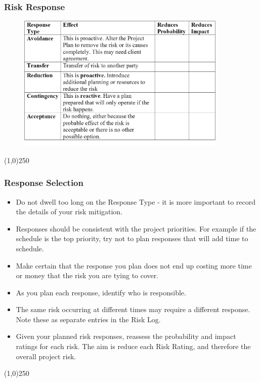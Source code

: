\begin{frame}
\frametitle{Risk Response}
\begin{figure}
	\centering
		\includegraphics[width = 10cm ]{images/Matrix.png}
	\label{fig:Matrix}
\end{figure}

\end{frame}\begin{center}\line(1,0){250}\end{center}





\begin{frame}
\frametitle{Response Selection}
\begin{itemize}
\item Do not dwell too long on the Response Type - it is more important to record the details of your risk mitigation.
\item Responses should be consistent with the project priorities. For example if the schedule is the top priority, try not to plan responses that will add time to schedule.
\item Make certain that the response you plan does not end up costing more time or money that the risk you are tying to cover. 
\item As you plan each response, identify who is responsible.
\item The same risk occurring at different times may require a different response. Note these as separate entries in the Risk Log.
\item Given your planned risk responses, reassess the probability and impact ratings for each risk. The aim is reduce each Risk Rating, and therefore the overall project risk.
\end{itemize}
\end{frame}\begin{center}\line(1,0){250}\end{center}





